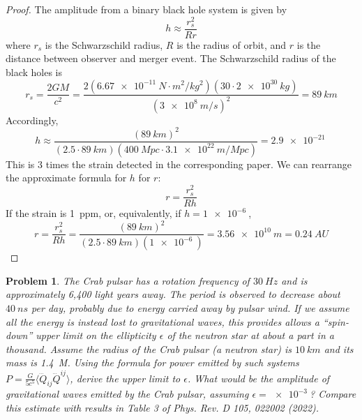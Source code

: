 \documentclass{article}
\newtheorem{prob}{Problem}
\begin{document}
\begin{proof}
  The amplitude from a binary black hole system is given by
  \[
    h \approx \frac{r_{s}^{2}}{Rr}
  \]
  where $r_{s}$ is the Schwarzschild radius, $R$ is the radius of orbit, and $r$ is the distance between observer and merger event.
  The Schwarzschild radius of the black holes is
  \[
    r_{s} = \frac{2GM}{c^{2}} = \frac{2(\SI{6.67e-11}{N\cdot m^{2}/kg^{2}})(30 \cdot \SI{2e30}{kg})}{(\SI{3e8}{m/s})^{2}}
    = \SI{89}{km}
  \]
  Accordingly,
  \[
    h \approx \frac{(\SI{89}{km})^{2}}{(2.5\cdot\SI{89}{km})(\SI{400}{Mpc} \cdot \SI{3.1e22}{m / Mpc})} = \SI{2.9e-21}{}
  \]
  This is 3 times the strain detected in the corresponding paper.
  We can rearrange the approximate formula for $h$ for $r$:
  \[
    r = \frac{r_{s}^{2}}{Rh}
  \]
  If the strain is \SI{1}{ppm}, or, equivalently, if $h = \SI{1e-6}{}$,
  \[
    r = \frac{r_{s}^{2}}{Rh} = \frac{(\SI{89}{km})^{2}}{(2.5\cdot \SI{89}{km})(\SI{1e-6}{})} = \SI{3.56e10}{m} = \SI{0.24}{AU}
  \]
\end{proof}

\begin{prob}
  The Crab pulsar has a rotation frequency of $\SI{30}{Hz}$ and is approximately 6,400 light years away.
  The period is observed to decrease about $\SI{40}{ns}$ per day, probably due to energy carried away by pulsar wind.
  If we assume all the energy is instead lost to gravitational waves,
  this provides allows a ``spin-down'' upper limit on the ellipticity $\epsilon$ of the neutron star at about a part in a thousand.
  Assume the radius of the Crab pulsar (a neutron star) is $\SI{10}{km}$ and its mass is \SI{1.4}{M_{\odot}}.
  Using the formula for power emitted by such systems $P = \frac{G}{5c^{5}}\langle \dddot{Q}_{ij}\dddot{Q}^{ij} \rangle$,
  derive the upper limit to $\epsilon$.
  What would be the amplitude of gravitational waves emitted by the Crab pulsar, assuming $\epsilon = \SI{e-3}{}$?
  Compare this estimate with results in Table 3 of Phys. Rev. D 105, 022002 (2022).
\end{prob}
\end{document}
